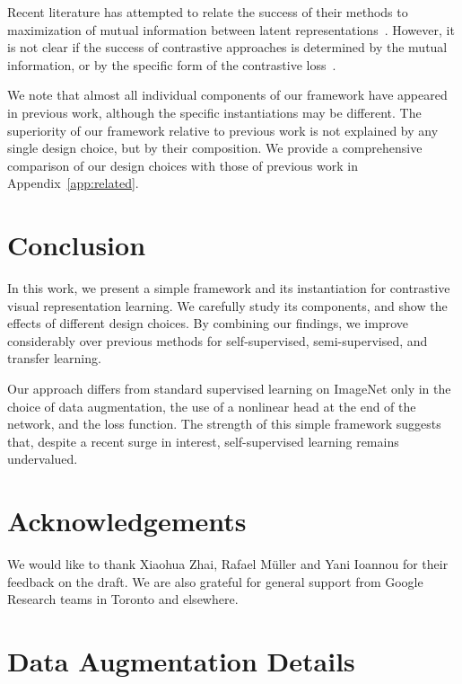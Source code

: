 \documentclass{article}
\begin{document}
Recent literature has attempted to relate the success of their methods to maximization of mutual information between latent representations~\cite{oord2018representation,henaff2019data,hjelm2018learning,bachman2019learning}. However, it is not clear if the success of contrastive approaches is determined by the mutual information, or by the specific form of the contrastive loss~\cite{tschannen2019mutual}. 

We note that almost all individual components of our framework have appeared in previous work, although the specific instantiations may be different. The superiority of our framework relative to previous work is not explained by any single design choice, but by their composition. We provide a comprehensive comparison of our design choices with those of previous work in Appendix~\ref{app:related}.
%
 \vspace{-.5em}\section{Conclusion}
In this work, we present a simple framework and its instantiation for contrastive visual representation learning. We carefully study its components, and show the effects of different design choices. By combining our findings, we improve considerably over previous methods for self-supervised, semi-supervised, and transfer learning.

Our approach differs from standard supervised learning on ImageNet only in the choice of data augmentation, the use of a nonlinear head at the end of the network, and the loss function. The strength of this simple framework suggests that, despite a recent surge in interest, self-supervised learning remains undervalued. 
 
\section*{Acknowledgements}
We would like to thank Xiaohua Zhai, Rafael Müller and Yani Ioannou for their feedback on the draft.
We are also grateful for general support from Google Research teams in Toronto and elsewhere.

\FloatBarrier
{\small

}

\cleardoublepage
\appendix
{}
\onecolumn

\appendix
\section{Data Augmentation Details}
\label{app:da}
\end{document}
